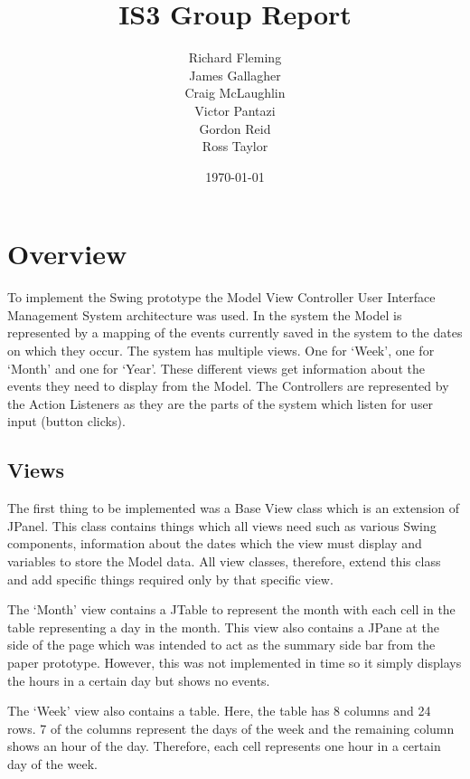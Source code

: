 \documentclass{article}
\title{IS3 Group Report}
\author{
  Richard Fleming \\
  James Gallagher \\
  Craig McLaughlin \\
  Victor Pantazi \\  
  Gordon Reid \\
  Ross Taylor}
\date{\today}
\begin{document}

\maketitle


\section{Overview}

To implement the Swing prototype the Model View Controller User
Interface Management System architecture was used. In the system the
Model is represented by a mapping of the events currently saved in the
system to the dates on which they occur. The system has multiple views.
One for `Week', one for `Month' and one for `Year'. These
different views get information about the events they need to display
from the Model. The Controllers are represented by the Action Listeners
as they are the parts of the system which listen for user input (button
clicks).

\subsection{Views}

The first thing to be implemented was a Base View class which is an
extension of JPanel. This class contains things which all views need
such as various Swing components, information about the dates which
the view must display and variables to store the Model data. All view
classes, therefore, extend this class and add specific things required
only by that specific view.

The `Month' view contains a JTable to represent the month with each cell
in the table representing a day in the month. This view also contains a
JPane at the side of the page which was intended to act as the summary
side bar from the paper prototype. However, this was not implemented in
time so it simply displays the hours in a certain day but shows no
events.

The `Week' view also contains a table. Here, the table has 8 columns and
24 rows. 7 of the columns represent the days of the week and the
remaining column shows an hour of the day. Therefore, each cell
represents one hour in a certain day of the week.
\end{document}
